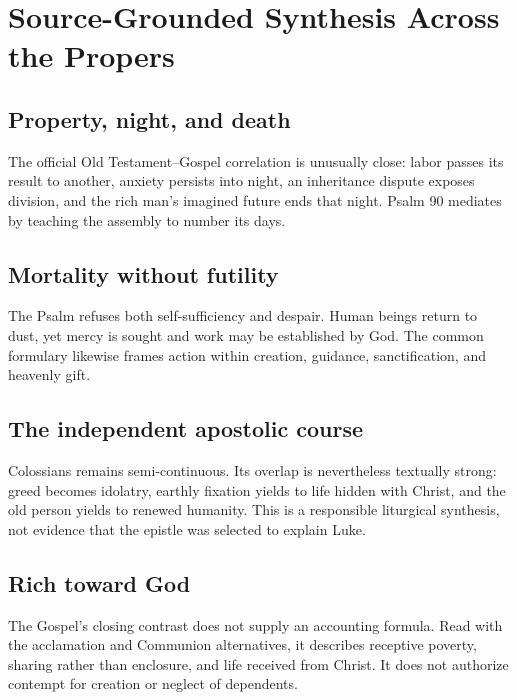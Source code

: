 \label{triptych:brief-synthesis:next}
\section*{Source-Grounded Synthesis Across the Propers}
\subsection*{Property, night, and death}
The official Old Testament--Gospel correlation is unusually close: labor
passes its result to another, anxiety persists into night, an inheritance
dispute exposes division, and the rich man's imagined future ends that night.
Psalm 90 mediates by teaching the assembly to number its days.
\subsection*{Mortality without futility}
The Psalm refuses both self-sufficiency and despair. Human beings return to
dust, yet mercy is sought and work may be established by God. The common
formulary likewise frames action within creation, guidance, sanctification,
and heavenly gift.
\subsection*{The independent apostolic course}
Colossians remains semi-continuous. Its overlap is nevertheless textually
strong: greed becomes idolatry, earthly fixation yields to life hidden with
Christ, and the old person yields to renewed humanity. This is a responsible
liturgical synthesis, not evidence that the epistle was selected to explain
Luke.
\subsection*{Rich toward God}
The Gospel's closing contrast does not supply an accounting formula. Read with
the acclamation and Communion alternatives, it describes receptive poverty,
sharing rather than enclosure, and life received from Christ. It does not
authorize contempt for creation or neglect of dependents.
